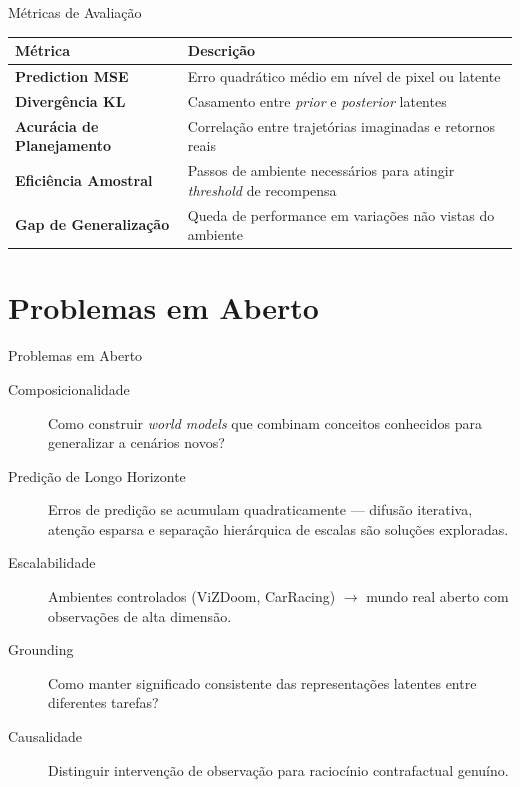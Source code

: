 \documentclass[aspectratio=169]{beamer}
\begin{document}
\begin{frame}{Métricas de Avaliação}
  \centering
  \begin{tabularx}{\textwidth}{lX}
    \toprule
    \textbf{Métrica} & \textbf{Descrição} \\
    \midrule
    \textbf{Prediction MSE} & Erro quadrático médio em nível de pixel ou latente \\
    \textbf{Divergência KL} & Casamento entre \textit{prior} e \textit{posterior} latentes \\
    \textbf{Acurácia de Planejamento} & Correlação entre trajetórias imaginadas e retornos reais \\
    \textbf{Eficiência Amostral} & Passos de ambiente necessários para atingir \textit{threshold} de recompensa \\
    \textbf{Gap de Generalização} & Queda de performance em variações não vistas do ambiente \\
    \bottomrule
  \end{tabularx}
\end{frame}

\section{Problemas em Aberto}

\begin{frame}{Problemas em Aberto}
  \begin{description}
    \item[Composicionalidade] Como construir \textit{world models} que combinam conceitos conhecidos para generalizar a cenários novos?
    \item[Predição de Longo Horizonte] Erros de predição se acumulam quadraticamente --- difusão iterativa, atenção esparsa e separação hierárquica de escalas são soluções exploradas.
    \item[Escalabilidade] Ambientes controlados (ViZDoom, CarRacing) $\rightarrow$ mundo real aberto com observações de alta dimensão.
    \item[Grounding] Como manter significado consistente das representações latentes entre diferentes tarefas?
    \item[Causalidade] Distinguir intervenção de observação para raciocínio contrafactual genuíno.
  \end{description}
\end{frame}
\end{document}
